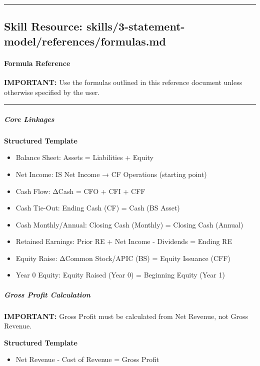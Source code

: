 \documentclass[11pt]{article}
\begin{document}
\vspace{0.8em}\hrule\vspace{0.8em}

\subsection{Skill Resource: skills/3-statement-model/references/formulas.md}\label{file:skills-3-statement-model-references-formulas-md}

\paragraph{Formula Reference}\mbox{}\par

\textbf{IMPORTANT:} Use the formulas outlined in this reference document unless otherwise specified by the user.


\vspace{0.5em}\hrule\vspace{0.5em}

\subparagraph{Core Linkages}\mbox{}\par

\textbf{Structured Template}
\begin{itemize}[leftmargin=*,itemsep=2pt,topsep=2pt]
\item {} Balance Sheet: Assets = Liabilities + Equity
\item {} Net Income: IS Net Income → CF Operations (starting point)
\item {} Cash Flow: ΔCash = CFO + CFI + CFF
\item {} Cash Tie-Out: Ending Cash (CF) = Cash (BS Asset)
\item {} Cash Monthly/Annual: Closing Cash (Monthly) = Closing Cash (Annual)
\item {} Retained Earnings: Prior RE + Net Income - Dividends = Ending RE
\item {} Equity Raise: ΔCommon Stock/APIC (BS) = Equity Issuance (CFF)
\item {} Year 0 Equity: Equity Raised (Year 0) = Beginning Equity (Year 1)
\end{itemize}

\subparagraph{Gross Profit Calculation}\mbox{}\par

\textbf{IMPORTANT:} Gross Profit must be calculated from Net Revenue, not Gross Revenue.


\textbf{Structured Template}
\begin{itemize}[leftmargin=*,itemsep=2pt,topsep=2pt]
\item {} Net Revenue - Cost of Revenue = Gross Profit
\end{itemize}
\end{document}
